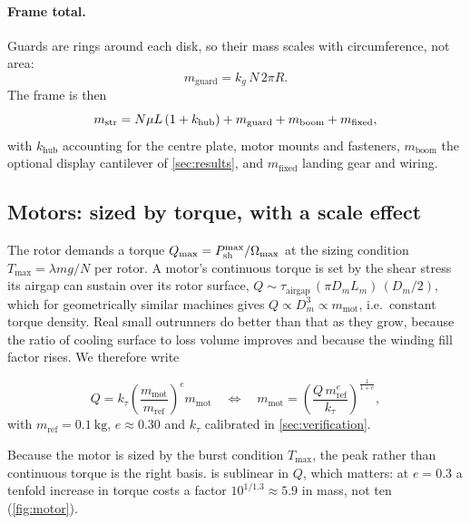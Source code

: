 \paragraph{Frame total.} Guards are rings around each disk, so their mass scales
with circumference, not area:
\begin{equation}
  m_{\mathrm{guard}} = k_g\, N\, 2\pi R .
  \label{eq:guards}
\end{equation}
The frame is then
\begin{equation}
  m_{\mathrm{str}} = N\mu L\,(1+k_{\mathrm{hub}}) + m_{\mathrm{guard}}
          + m_{\mathrm{boom}} + m_{\mathrm{fixed}} ,
  \label{eq:frame}
\end{equation}
with $k_{\mathrm{hub}}$ accounting for the centre plate, motor mounts and
fasteners, $m_{\mathrm{boom}}$ the optional display cantilever of
\cref{sec:results}, and $m_{\mathrm{fixed}}$ landing gear and wiring.

\subsection{Motors: sized by torque, with a scale effect}

The rotor demands a torque $Q_{\max} = P_{\mathrm{sh}}^{\max}/\Omega_{\max}$ at the
sizing condition $T_{\max}=\lambda mg/N$ per rotor. A motor's continuous torque
is set by the shear stress its airgap can sustain over its rotor surface,
$Q \sim \tau_{\mathrm{airgap}}\,(\pi D_m L_m)\,(D_m/2)$, which for
geometrically similar machines gives $Q\propto D_m^3 \propto m_{\mathrm{mot}}$,
i.e.\ constant torque density. Real small outrunners do better than that as
they grow, because the ratio of cooling surface to loss volume improves and
because the winding fill factor rises. We therefore write

\begin{model}
\label{mod:motor}
\begin{equation}
  Q = k_\tau \left(\frac{m_{\mathrm{mot}}}{m_{\mathrm{ref}}}\right)^{\!e}
      m_{\mathrm{mot}}
  \quad\Longleftrightarrow\quad
  m_{\mathrm{mot}}
  = \left(\frac{Q\, m_{\mathrm{ref}}^{e}}{k_\tau}\right)^{\!\frac{1}{1+e}} ,
  \label{eq:motormass}
\end{equation}
with $m_{\mathrm{ref}}=\SI{0.1}{\kilo\gram}$, $e\approx0.30$ and $k_\tau$
calibrated in \cref{sec:verification}.
\end{model}

Because the motor is sized by the burst condition $T_{\max}$, the peak rather
than continuous torque is the right basis.  is sublinear in
$Q$, which matters: at $e=0.3$ a tenfold increase in torque costs a factor
$10^{1/1.3}\approx5.9$ in mass, not ten (\cref{fig:motor}).

